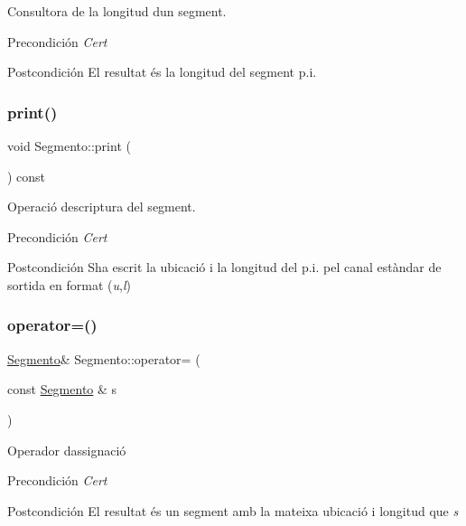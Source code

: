 Consultora de la longitud d\textquotesingle{}un segment. 

\begin{DoxyPrecond}{Precondición}
{\itshape Cert} 
\end{DoxyPrecond}
\begin{DoxyPostcond}{Postcondición}
El resultat és la longitud del segment p.\+i. 
\end{DoxyPostcond}
\mbox{\label{class_segmento_ac6f9e53987e915d2d0b6847aeb8e49ed}} 
\subsubsection{\texorpdfstring{print()}{print()}}
{\footnotesize\ttfamily void Segmento\+::print (\begin{DoxyParamCaption}{ }\end{DoxyParamCaption}) const}



Operació d\textquotesingle{}escriptura del segment. 

\begin{DoxyPrecond}{Precondición}
{\itshape Cert} 
\end{DoxyPrecond}
\begin{DoxyPostcond}{Postcondición}
S\textquotesingle{}ha escrit la ubicació i la longitud del p.\+i. pel canal estàndar de sortida en format ({\itshape u},{\itshape l}) 
\end{DoxyPostcond}
\mbox{\label{class_segmento_aee5b332a00494aa3963fe5a1496ab3f4}} 
\subsubsection{\texorpdfstring{operator=()}{operator=()}}
{\footnotesize\ttfamily \hyperlink{class_segmento}{Segmento}\& Segmento\+::operator= (\begin{DoxyParamCaption}\item[{const \hyperlink{class_segmento}{Segmento} \&}]{s }\end{DoxyParamCaption})}



Operador d\textquotesingle{}assignació 

\begin{DoxyPrecond}{Precondición}
{\itshape Cert} 
\end{DoxyPrecond}
\begin{DoxyPostcond}{Postcondición}
El resultat és un segment amb la mateixa ubicació i longitud que {\itshape s} 
\end{DoxyPostcond}
\mbox{\label{class_segmento_a1f1e5977425950af37d4ca52761d381a}} 
